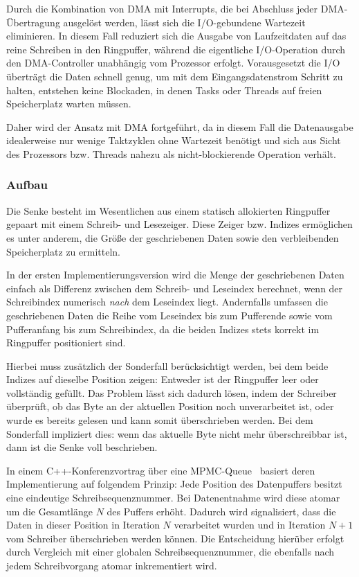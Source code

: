 Durch die Kombination von DMA mit Interrupts, die bei Abschluss jeder
DMA-Übertragung ausgelöst werden, lässt sich die I/O-gebundene Wartezeit
eliminieren. In diesem Fall reduziert sich die Ausgabe von Laufzeitdaten auf das
reine Schreiben in den Ringpuffer, während die eigentliche I/O-Operation durch
den DMA-Controller unabhängig vom Prozessor erfolgt. Vorausgesetzt die I/O
überträgt die Daten schnell genug, um mit dem Eingangsdatenstrom Schritt zu
halten, entstehen keine Blockaden, in denen Tasks oder Threads auf freien
Speicherplatz warten müssen.

Daher wird der Ansatz mit DMA fortgeführt, da in diesem Fall die Datenausgabe
idealerweise nur wenige Taktzyklen ohne Wartezeit benötigt und sich aus Sicht
des Prozessors bzw. Threads nahezu als nicht-blockierende Operation verhält.

\subsubsection{Aufbau}

Die Senke besteht im Wesentlichen aus einem statisch allokierten Ringpuffer
gepaart mit einem Schreib- und Lesezeiger. Diese Zeiger bzw. Indizes ermöglichen
es unter anderem, die Größe der geschriebenen Daten sowie den verbleibenden
Speicherplatz zu ermitteln.

In der ersten Implementierungsversion wird die Menge der geschriebenen Daten
einfach als Differenz zwischen dem Schreib- und Leseindex berechnet, wenn der
Schreibindex numerisch \textit{nach} dem Leseindex liegt. Andernfalls umfassen
die geschriebenen Daten die Reihe vom Leseindex bis zum Pufferende sowie vom
Pufferanfang bis zum Schreibindex, da die beiden Indizes stets korrekt im
Ringpuffer positioniert sind.

Hierbei muss zusätzlich der Sonderfall berücksichtigt werden, bei dem beide
Indizes auf dieselbe Position zeigen: Entweder ist der Ringpuffer leer oder
vollständig gefüllt. Das Problem lässt sich dadurch lösen, indem der Schreiber
überprüft, ob das Byte an der aktuellen Position noch unverarbeitet ist, oder
wurde es bereits gelesen und kann somit überschrieben werden. Bei dem Sonderfall
impliziert dies: wenn das aktuelle Byte nicht mehr überschreibbar ist, dann ist
die Senke voll beschrieben.

In einem C++-Konferenzvortrag über eine
\ac{MPMC}-Queue~\cite{CppCon2024LockFreeQueue} basiert deren Implementierung auf
folgendem Prinzip: Jede Position des Datenpuffers besitzt eine eindeutige
Schreibsequenznummer. Bei Datenentnahme wird diese atomar um die Gesamtlänge $N$
des Puffers erhöht. Dadurch wird signalisiert, dass die Daten in dieser Position
in Iteration $N$ verarbeitet wurden und in Iteration $N+1$ vom Schreiber
überschrieben werden können. Die Entscheidung hierüber erfolgt durch Vergleich
mit einer globalen Schreibsequenznummer, die ebenfalls nach jedem Schreibvorgang
atomar inkrementiert wird.

